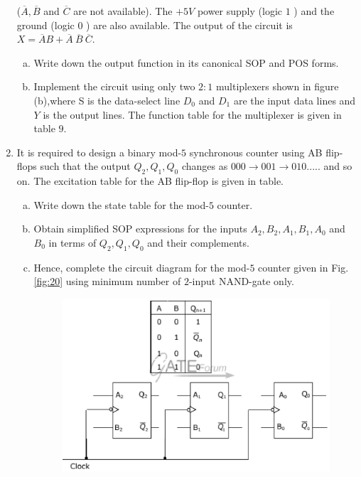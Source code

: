 \documentclass[journal,12pt,twocolumn]{IEEEtran}
\begin{document}
\begin{enumerate}
\begin{figure}
\caption{}

\label{fig:19}

\end{figure} 


($\overline{A},\overline{B}$ and $\overline{C}$ are not available). The $+5V$ power supply (logic $1$ ) and the ground (logic $0$ ) are also available. The output of the circuit is $X=\overline{A}B+\overline{A}\ \overline{B} \ \overline{C}$.


\begin{enumerate}[(a)]
 
\item Write down the output function in its canonical SOP and POS forms.

\item Implement the circuit using only two $2:1$ multiplexers shown in figure (b),where S is the data-select line $D_0$ and $D_1$ are the input data lines and $Y$ is the output lines. The function table for the multiplexer is given in table $9$.

\end{enumerate}


\item It is required to design a binary mod-$5$ synchronous counter using AB flip-flops such that the output $Q_2,Q_1,Q_0$ changes as $ 000 \rightarrow 001 \rightarrow 010 .....$ and so on. The excitation table for the AB flip-flop is given in table.

\begin{enumerate}[(a)]
 
\item Write down the state table for the mod-$5$ counter.

\item Obtain simplified SOP expressions for the inputs $A_2,B_2,A_1,B_1,A_0$ and $B_0$ in terms of $Q_2,Q_1,Q_0$ and their complements.

\item Hence, complete the circuit diagram for the mod-$5$ counter given in Fig. \ref{fig:20} using minimum number of $2$-input NAND-gate only.


\begin{figure}

\centering

\includegraphics[width=\columnwidth]{./figs/24.eps}


\end{figure}
\end{enumerate}
\end{enumerate}
\end{document}
